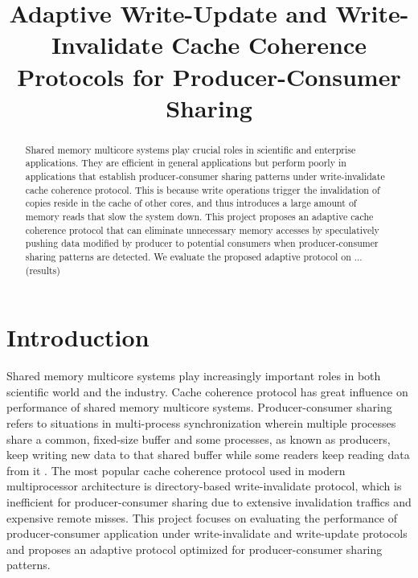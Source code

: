 \documentclass[conference]{IEEEtran}
\begin{document}
%
\title{Adaptive Write-Update and Write-Invalidate Cache Coherence Protocols for Producer-Consumer Sharing}


\author{
\and
{}
}

\maketitle


\begin{abstract}
Shared memory multicore systems play crucial roles in scientific and enterprise applications. They are efficient in general applications but perform poorly in applications that establish producer-consumer sharing patterns under write-invalidate cache coherence protocol. This is because write operations trigger the invalidation of copies reside in the cache of other cores, and thus introduces a large amount of memory reads that slow the system down. This project proposes an adaptive cache coherence protocol that can eliminate unnecessary memory accesses by speculatively pushing data modified by producer to potential consumers when producer-consumer sharing patterns are detected. We evaluate the proposed adaptive protocol on ... (results)
\end{abstract}


\section{Introduction}
Shared memory multicore systems play increasingly important roles in both scientific world and the industry. Cache coherence protocol has great influence on performance of shared memory multicore systems. Producer-consumer sharing refers to situations in multi-process synchronization wherein multiple processes share a common, fixed-size buffer and some processes, as known as producers, keep writing new data to that shared buffer while some readers keep reading data from it \cite{wiki}. The most popular cache coherence protocol used in modern multiprocessor architecture is directory-based write-invalidate protocol, which is inefficient for producer-consumer sharing due to extensive invalidation traffics and expensive remote misses. This project focuses on evaluating the performance of producer-consumer application under write-invalidate and write-update protocols and proposes an adaptive protocol optimized for producer-consumer sharing patterns.
\end{document}
